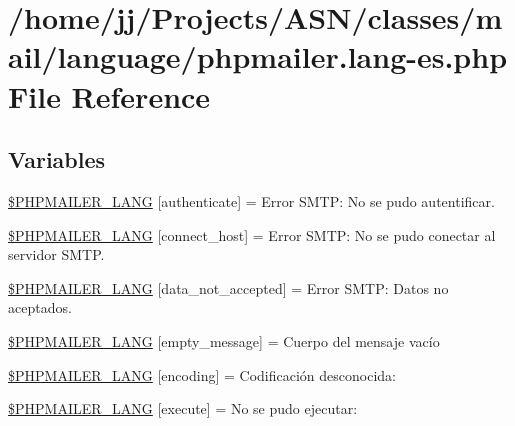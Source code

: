 \hypertarget{phpmailer_8lang-es_8php}{}\section{/home/jj/\+Projects/\+A\+S\+N/classes/mail/language/phpmailer.lang-\/es.php File Reference}
\label{phpmailer_8lang-es_8php}
\subsection*{Variables}
\begin{DoxyCompactItemize}
\item 
\hyperlink{phpmailer_8lang-es_8php_a2cb33073c989b85580748e331ed8b4aa}{\$\+P\+H\+P\+M\+A\+I\+L\+E\+R\+\_\+\+L\+A\+NG} \mbox{[}\textquotesingle{}authenticate\textquotesingle{}\mbox{]} = \textquotesingle{}Error S\+M\+T\+P\+: No se pudo autentificar.\textquotesingle{}
\item 
\hyperlink{phpmailer_8lang-es_8php_a2ee0cc637a06b96e45600db31c6799ee}{\$\+P\+H\+P\+M\+A\+I\+L\+E\+R\+\_\+\+L\+A\+NG} \mbox{[}\textquotesingle{}connect\+\_\+host\textquotesingle{}\mbox{]} = \textquotesingle{}Error S\+M\+T\+P\+: No se pudo conectar al servidor S\+M\+T\+P.\textquotesingle{}
\item 
\hyperlink{phpmailer_8lang-es_8php_a814c6b191205d2361b3233e9c9d6fda5}{\$\+P\+H\+P\+M\+A\+I\+L\+E\+R\+\_\+\+L\+A\+NG} \mbox{[}\textquotesingle{}data\+\_\+not\+\_\+accepted\textquotesingle{}\mbox{]} = \textquotesingle{}Error S\+M\+T\+P\+: Datos no aceptados.\textquotesingle{}
\item 
\hyperlink{phpmailer_8lang-es_8php_a33772099f637c9d6c2cd7425e0e37fed}{\$\+P\+H\+P\+M\+A\+I\+L\+E\+R\+\_\+\+L\+A\+NG} \mbox{[}\textquotesingle{}empty\+\_\+message\textquotesingle{}\mbox{]} = \textquotesingle{}Cuerpo del mensaje vacío\textquotesingle{}
\item 
\hyperlink{phpmailer_8lang-es_8php_a817f7283f3d54c970a0c10305cc668cc}{\$\+P\+H\+P\+M\+A\+I\+L\+E\+R\+\_\+\+L\+A\+NG} \mbox{[}\textquotesingle{}encoding\textquotesingle{}\mbox{]} = \textquotesingle{}Codificación desconocida\+: \textquotesingle{}
\item 
\hyperlink{phpmailer_8lang-es_8php_a668217a9563a168f30f2a8548b6ed5a9}{\$\+P\+H\+P\+M\+A\+I\+L\+E\+R\+\_\+\+L\+A\+NG} \mbox{[}\textquotesingle{}execute\textquotesingle{}\mbox{]} = \textquotesingle{}No se pudo ejecutar\+: \textquotesingle{}
\item 

\end{DoxyCompactItemize}
